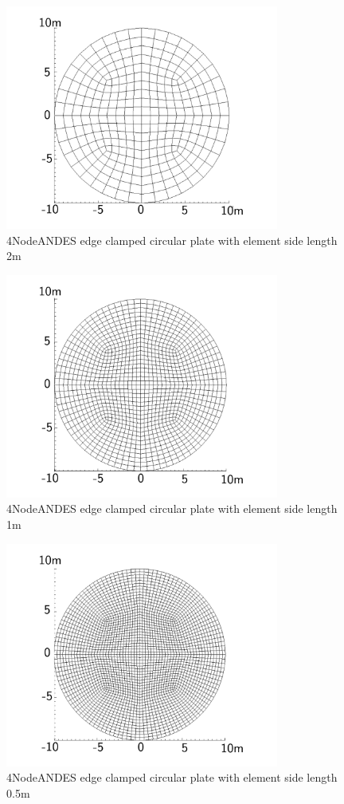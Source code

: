 \documentclass[fleqn,11pt]{article}
\begin{document}
\begin{figure}[H]
  \centering
  \includegraphics[width=9cm]{../Figure-files/circular_plate3.pdf}
  \caption{4NodeANDES edge clamped circular plate with element side length 2m }
  \label{fig 4NodeANDES edges clamped circular plate with element side length 2m }
\end{figure}

\newpage

\begin{figure}[H]
  \centering
  \includegraphics[width=9cm]{../Figure-files/circular_plate4.pdf}
  \caption{4NodeANDES edge clamped circular plate with element side length 1m }
  \label{fig 4NodeANDES edges clamped circular plate with element side length 1m }
\end{figure}


\begin{figure}[H]
  \centering
  \includegraphics[width=9cm]{../Figure-files/circular_plate5.pdf}
  \caption{4NodeANDES edge clamped circular plate with element side length 0.5m }
  \label{fig 4NodeANDES edges clamped circular plate with element side length 0.5m }
\end{figure}
\end{document}
